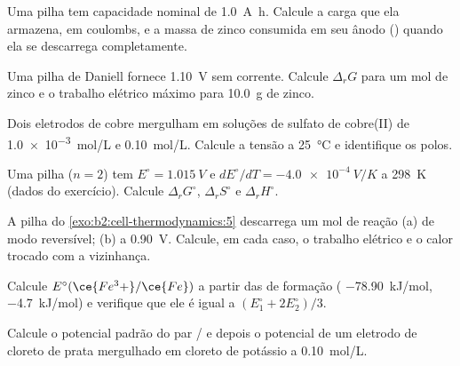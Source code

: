 \begin{exercise}[$\star$]\label{exo:b2:cell-thermodynamics:2}
Uma pilha tem capacidade nominal de \qty{1.0}{A.h}. Calcule a carga que ela
armazena, em coulombs, e a massa de zinco consumida em seu ânodo () quando ela
se descarrega completamente.
\end{exercise}

\begin{exercise}[$\star$]\label{exo:b2:cell-thermodynamics:3}
Uma pilha de Daniell fornece \qty{1.10}{V} sem corrente. Calcule $\Delta_r G$ para um
mol de zinco e o trabalho elétrico máximo para \qty{10.0}{g} de zinco.
\end{exercise}

\begin{exercise}[$\star$]\label{exo:b2:cell-thermodynamics:4}
Dois eletrodos de cobre mergulham em soluções de sulfato de cobre(II) de
\qty{1.0e-3}{mol/L} e \qty{0.10}{mol/L}. Calcule a tensão a \qty{25}{\degreeCelsius} e
identifique os polos.
\end{exercise}

\begin{exercise}[$\star\star$]\label{exo:b2:cell-thermodynamics:5}
Uma pilha ($n = 2$) tem $E^\circ = \qty{1.015}{V}$ e $dE^\circ/dT = \qty{-4.0e-4}{V/K}$
a \qty{298}{K} (dados do exercício). Calcule $\Delta_r G^\circ$, $\Delta_r S^\circ$ e
$\Delta_r H^\circ$.
\end{exercise}

\begin{exercise}[$\star\star$]\label{exo:b2:cell-thermodynamics:6}
A pilha do \cref{exo:b2:cell-thermodynamics:5} descarrega um mol de reação
(a) de modo reversível; (b) a \qty{0.90}{V}. Calcule, em cada caso, o trabalho
elétrico e o calor trocado com a vizinhança.
\end{exercise}

\begin{exercise}[$\star\star$]\label{exo:b2:cell-thermodynamics:7}
Calcule $E^\circ(\ce{Fe^3+}/\ce{Fe})$ a partir das  de formação
( \qty{-78.90}{kJ/mol},  \qty{-4.7}{kJ/mol}) e verifique que ele
é igual a $(E_1^\circ + 2E_2^\circ)/3$.
\end{exercise}

\begin{exercise}[$\star\star$]\label{exo:b2:cell-thermodynamics:8}
Calcule o potencial padrão do par / e depois o potencial de um
eletrodo de cloreto de prata mergulhado em cloreto de potássio a
\qty{0.10}{mol/L}.
\end{exercise}


